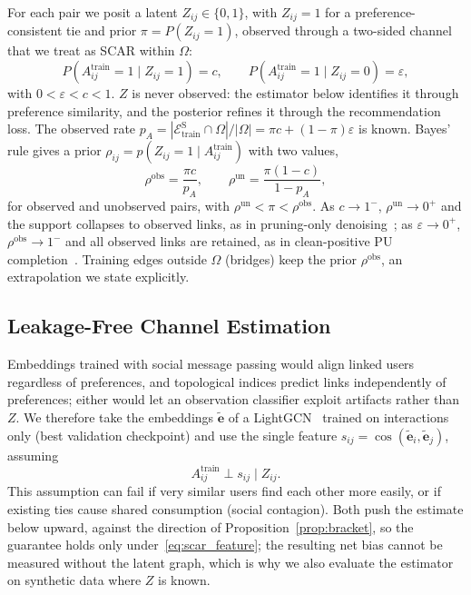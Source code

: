 \documentclass[sigconf]{acmart}
\begin{document}
For each pair we posit a latent $Z_{ij} \in \{0,1\}$, with $Z_{ij}=1$ for a preference-consistent tie and prior $\pi = P(Z_{ij}=1)$, observed through a two-sided channel that we treat as SCAR within $\Omega$:
\begin{equation}
    P(A_{ij}^{\text{train}}=1 \mid Z_{ij}=1) = c, \qquad P(A_{ij}^{\text{train}}=1 \mid Z_{ij}=0) = \varepsilon, \label{eq:channel}
\end{equation}
with $0 < \varepsilon < c < 1$. $Z$ is never observed: the estimator below identifies it through preference similarity, and the posterior refines it through the recommendation loss. The observed rate $p_A = |\mathcal{E}_{\text{train}}^{\text{S}} \cap \Omega| / |\Omega| = \pi c + (1-\pi)\varepsilon$ is known. Bayes' rule gives a prior $\rho_{ij} = p(Z_{ij}=1 \mid A_{ij}^{\text{train}})$ with two values,
\begin{equation}
    \rho^{\text{obs}} = \frac{\pi c}{p_A}, \qquad \rho^{\text{un}} = \frac{\pi(1-c)}{1 - p_A}, \label{eq:rho}
\end{equation}
for observed and unobserved pairs, with $\rho^{\text{un}} < \pi < \rho^{\text{obs}}$. As $c \to 1^-$, $\rho^{\text{un}} \to 0^+$ and the support collapses to observed links, as in pruning-only denoising~\cite{10.1145/3637528.3671807}; as $\varepsilon \to 0^+$, $\rho^{\text{obs}} \to 1^-$ and all observed links are retained, as in clean-positive PU completion~\cite{10.1609/aaai.v39i17.33966}. Training edges outside $\Omega$ (bridges) keep the prior $\rho^{\text{obs}}$, an extrapolation we state explicitly.

\subsection{Leakage-Free Channel Estimation}
\label{sec:estimation}
Embeddings trained with social message passing would align linked users regardless of preferences, and topological indices predict links independently of preferences; either would let an observation classifier exploit artifacts rather than $Z$. We therefore take the embeddings $\tilde{\mathbf{e}}$ of a LightGCN~\cite{10.1145/3397271.3401063} trained on interactions only (best validation checkpoint) and use the single feature $s_{ij} = \cos(\tilde{\mathbf{e}}_i, \tilde{\mathbf{e}}_j)$, assuming
\begin{equation}
    A_{ij}^{\text{train}} \perp s_{ij} \mid Z_{ij}. \label{eq:scar_feature}
\end{equation}
This assumption can fail if very similar users find each other more easily, or if existing ties cause shared consumption (social contagion). Both push the estimate below upward, against the direction of Proposition~\ref{prop:bracket}, so the guarantee holds only under~\eqref{eq:scar_feature}; the resulting net bias cannot be measured without the latent graph, which is why we also evaluate the estimator on synthetic data where $Z$ is known.
\end{document}
